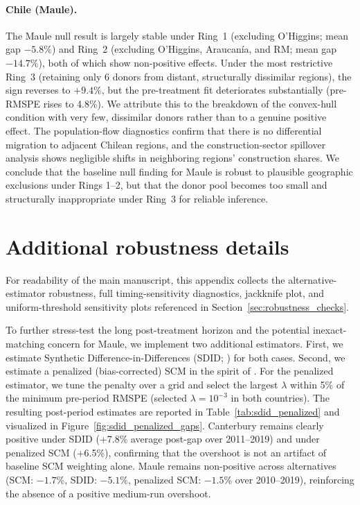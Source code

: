 \documentclass[12pt]{article}
\begin{document}
\paragraph{Chile (Maule).}
The Maule null result is largely stable under Ring~1 (excluding O'Higgins; mean gap $-5.8\%$) and Ring~2 (excluding O'Higgins, Araucanía, and RM; mean gap $-14.7\%$), both of which show non-positive effects. Under the most restrictive Ring~3 (retaining only 6 donors from distant, structurally dissimilar regions), the sign reverses to $+9.4\%$, but the pre-treatment fit deteriorates substantially (pre-RMSPE rises to 4.8\%). We attribute this to the breakdown of the convex-hull condition with very few, dissimilar donors rather than to a genuine positive effect. The population-flow diagnostics confirm that there is no differential migration to adjacent Chilean regions, and the construction-sector spillover analysis shows negligible shifts in neighboring regions' construction shares. We conclude that the baseline null finding for Maule is robust to plausible geographic exclusions under Rings 1--2, but that the donor pool becomes too small and structurally inappropriate under Ring~3 for reliable inference.

\newpage

\section{Additional robustness details}
\label{sec:additional_robustness_appendix}

For readability of the main manuscript, this appendix collects the alternative-estimator robustness, full timing-sensitivity diagnostics, jackknife plot, and uniform-threshold sensitivity plots referenced in Section~\ref{sec:robustness_checks}.

To further stress-test the long post-treatment horizon and the potential inexact-matching concern for Maule, we implement two additional estimators. First, we estimate Synthetic Difference-in-Differences (SDID; \cite{arkhangelsky2021sdid}) for both cases. Second, we estimate a penalized (bias-corrected) SCM in the spirit of \textcite{abadie2021penalized}. For the penalized estimator, we tune the penalty over a grid and select the largest $\lambda$ within 5\% of the minimum pre-period RMSPE (selected $\lambda=10^{-3}$ in both countries). The resulting post-period estimates are reported in Table~\ref{tab:sdid_penalized} and visualized in Figure~\ref{fig:sdid_penalized_gaps}. Canterbury remains clearly positive under SDID (+7.8\% average post-gap over 2011--2019) and under penalized SCM (+6.5\%), confirming that the overshoot is not an artifact of baseline SCM weighting alone. Maule remains non-positive across alternatives (SCM: $-1.7$\%, SDID: $-5.1$\%, penalized SCM: $-1.5$\% over 2010--2019), reinforcing the absence of a positive medium-run overshoot.
\end{document}
